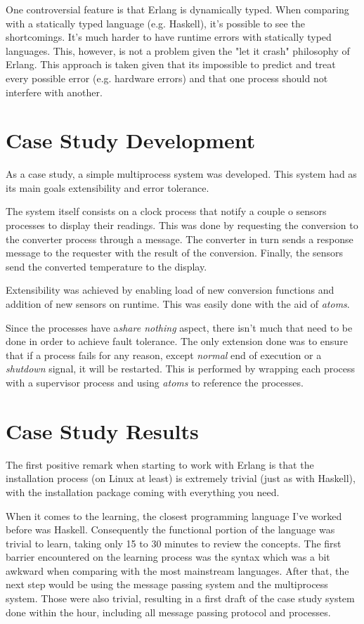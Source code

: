 \documentclass[twocolumn,10pt]{article}
\begin{document}
One controversial feature is that Erlang is dynamically typed. When comparing with a statically typed language (e.g. Haskell), it's possible to see the shortcomings. It's much harder to have runtime errors with statically typed languages. This, however, is not a problem given the "let it crash" philosophy of Erlang. This approach is taken given that its impossible to predict and treat every possible error (e.g. hardware errors) and that one process should not interfere with another.

\section*{Case Study Development}
As a case study, a simple multiprocess system was developed. This system had as its main goals extensibility and error tolerance.

The system itself consists on a clock process that notify a couple o sensors processes to display their readings. This was done by requesting the conversion to the converter process through a message. The converter in turn sends a response message to the requester with the result of the conversion. Finally, the sensors send the converted temperature to the display.

Extensibility was achieved by enabling load of new conversion functions and addition of new sensors on runtime. This was easily done with the aid of \textit{atoms}.

Since the processes have a\textit{share nothing} aspect, there isn't much that need to be done in order to achieve fault tolerance. The only extension done was to ensure that if a process fails for any reason, except \textit{normal} end of execution or a \textit{shutdown} signal, it will be restarted. This is performed by wrapping each process with a supervisor process and using \textit{atoms} to reference the processes.

\section*{Case Study Results}
The first positive remark when starting to work with Erlang is that the installation process (on Linux at least) is extremely trivial (just as with Haskell), with the installation package coming with everything you need.

When it comes to the learning, the closest programming language I've worked before was Haskell. Consequently the functional portion of the language was trivial to learn, taking only 15 to 30 minutes to review the concepts. The first barrier encountered on the learning process was the syntax which was a bit awkward when comparing with the most mainstream languages. After that, the next step would be using the message passing system and the multiprocess system. Those were also trivial, resulting in a first draft of the case study system done within the hour, including all message passing protocol and processes.
\end{document}
